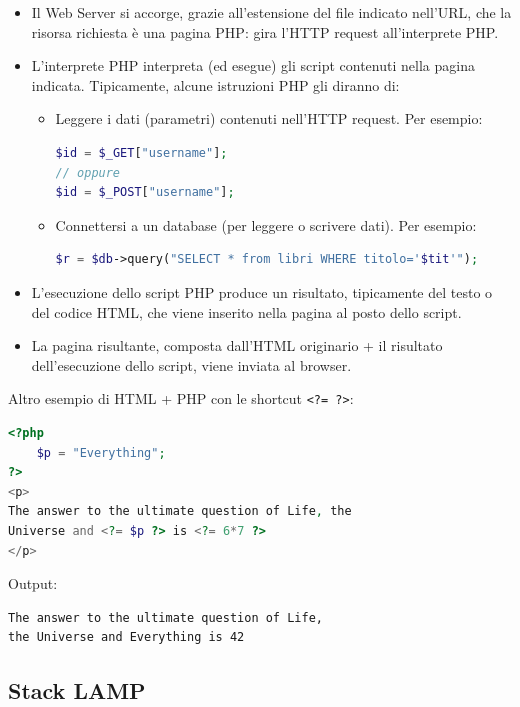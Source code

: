 \begin{itemize}
    \item Il Web Server si accorge, grazie all'estensione del file indicato nell'URL, che la risorsa richiesta è una pagina PHP: gira l'HTTP request all'interprete PHP.
    \item L'interprete PHP interpreta (ed esegue) gli script contenuti nella pagina indicata. Tipicamente, alcune istruzioni PHP gli diranno di:
    \begin{itemize}
        \item Leggere i dati (parametri) contenuti nell'HTTP request. Per esempio:
        \begin{lstlisting}[language=PHP]
$id = $_GET["username"];
// oppure
$id = $_POST["username"];
        \end{lstlisting}
        \item Connettersi a un database (per leggere o scrivere dati). Per esempio:
        \begin{lstlisting}[language=PHP]
$r = $db->query("SELECT * from libri WHERE titolo='$tit'");
        \end{lstlisting}
    \end{itemize}
    \item L'esecuzione dello script PHP produce un risultato, tipicamente del testo o del codice HTML, che viene inserito nella pagina al posto dello script.
    \item La pagina risultante, composta dall'HTML originario + il risultato dell'esecuzione dello script, viene inviata al browser.
\end{itemize}

Altro esempio di HTML + PHP con le shortcut \texttt{<?=\ ?>}:

\begin{lstlisting}[language=PHP]
<?php
    $p = "Everything";
?>
<p>
The answer to the ultimate question of Life, the
Universe and <?= $p ?> is <?= 6*7 ?>
</p>
\end{lstlisting}

Output:

\begin{verbatim}
The answer to the ultimate question of Life,
the Universe and Everything is 42
\end{verbatim}

\subsection{Stack LAMP}

